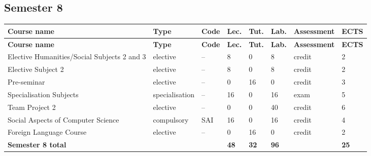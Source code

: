 \documentclass[12pt,a4paper]{article}
\newcommand{\thdrule}{\noalign{\global\setlength{\extrarowheight}{0pt}}}
\newcommand{\thdend}{\noalign{\global\setlength{\extrarowheight}{4pt}}}
\begin{document}
\subsection*{Semester 8}

{\scriptsize
\begin{longtable}{m{5.0cm}m{1.9cm}m{0.75cm}m{0.85cm}m{0.85cm}m{0.85cm}m{1.45cm}m{0.9cm}}
\thdrule\toprule
\rowcolor{pjatkRed}
{\color{white}\footnotesize\textbf{\vphantom{Ag}Course name}} & {\color{white}\footnotesize\textbf{\vphantom{Ag}Type}} & {\color{white}\footnotesize\textbf{\vphantom{Ag}Code}} & {\color{white}\footnotesize\textbf{\vphantom{Ag}Lec.}} & {\color{white}\footnotesize\textbf{\vphantom{Ag}Tut.}} & {\color{white}\footnotesize\textbf{\vphantom{Ag}Lab.}} & {\color{white}\footnotesize\textbf{\vphantom{Ag}Assessment}} & {\color{white}\footnotesize\textbf{\vphantom{Ag}ECTS}} \\
\midrule\thdend
\endfirsthead
\thdrule\toprule
\rowcolor{pjatkRed}
{\color{white}\footnotesize\textbf{\vphantom{Ag}Course name}} & {\color{white}\footnotesize\textbf{\vphantom{Ag}Type}} & {\color{white}\footnotesize\textbf{\vphantom{Ag}Code}} & {\color{white}\footnotesize\textbf{\vphantom{Ag}Lec.}} & {\color{white}\footnotesize\textbf{\vphantom{Ag}Tut.}} & {\color{white}\footnotesize\textbf{\vphantom{Ag}Lab.}} & {\color{white}\footnotesize\textbf{\vphantom{Ag}Assessment}} & {\color{white}\footnotesize\textbf{\vphantom{Ag}ECTS}} \\
\midrule\thdend
\endhead
\rowcolor{tableElective} Elective Humanities/Social Subjects 2 and 3 & {\scriptsize elective} & -- & 8 & 0 & 8 & {\scriptsize credit} & 2 \\
\rowcolor{tableElective} Elective Subject 2 & {\scriptsize elective} & -- & 8 & 0 & 8 & {\scriptsize credit} & 2 \\
\rowcolor{tableElective} Pre-seminar & {\scriptsize elective} & -- & 0 & 16 & 0 & {\scriptsize credit} & 3 \\
\rowcolor{tableElective} Specialisation Subjects & {\scriptsize specialisation} & -- & 16 & 0 & 16 & {\scriptsize exam} & 5 \\
\rowcolor{tableElective} Team Project 2 & {\scriptsize elective} & -- & 0 & 0 & 40 & {\scriptsize credit} & 6 \\
\rowcolor{tableRowAlt} Social Aspects of Computer Science & {\scriptsize compulsory} & SAI & 16 & 0 & 16 & {\scriptsize credit} & 4 \\
\rowcolor{tableElective} Foreign Language Course & {\scriptsize elective} & -- & 0 & 16 & 0 & {\scriptsize credit} & 2 \\
\midrule[\heavyrulewidth]
\rowcolor{tableSummary} \textbf{Semester 8 total} & & & \textbf{48} & \textbf{32} & \textbf{96} & & \textbf{25} \\
\bottomrule
\end{longtable}}
\end{document}
